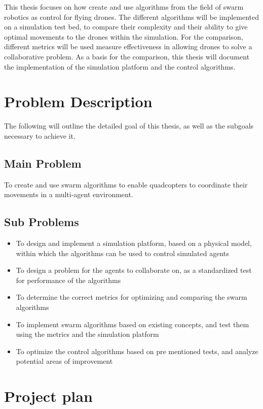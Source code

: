 This thesis focuses on how create and use algorithms from the field of swarm robotics as control for flying drones.
The different algorithms will be implemented on a simulation test bed, to compare their complexity and their ability to give optimal movements to the drones within the simulation. 
For the comparison, different metrics will be used measure effectiveness in allowing drones to solve a collaborative problem.
As a basis for the comparison, this thesis will document the implementation of the simulation platform and the control algorithms.

\section{Problem Description}
The following will outline the detailed goal of this thesis, as well as the subgoals necessary to achieve it. 

\subsection{Main Problem}
To create and use swarm algorithms to enable quadcopters to coordinate their movements in a multi-agent environment. 

\subsection{Sub Problems}
\label{intro:sub_problems}
\begin{itemize}
	\item{To design and implement a simulation platform, based on a physical model, within which the algorithms can be used to control simulated agents}
	\item{To design a problem for the agents to collaborate on, as a standardized test for performance of the algorithms}
	\item{To determine the correct metrics for optimizing and comparing the swarm algorithms}
	\item{To implement swarm algorithms based on existing concepts, and test them using the metrics and the simulation platform}
	\item{To optimize the control algorithms based on pre mentioned tests, and analyze potential areas of improvement}
\end{itemize}
 
\section{Project plan}
\label{sec:projectplan}

